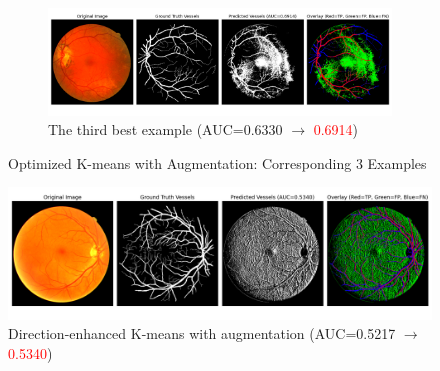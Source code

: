 \documentclass[final]{article}
\begin{document}
\begin{figure}[H]
    \ContinuedFloat
    \centering
    \begin{subfigure}[H]{\textwidth}
        \centering
        \includegraphics[scale=0.3]{Figures/4 Optimized 3rd.png}
        \vspace{-0.25cm}
        \caption{The third best example (AUC=0.6330 $\rightarrow$ \textcolor{red}{0.6914})}
        \label{fig:opt_aug3}
    \end{subfigure}
    \caption{Optimized K-means with Augmentation: Corresponding 3 Examples}
    \label{fig:opt_aug}
\end{figure}
\begin{figure}[H]
    \centering
    \includegraphics[scale=0.3]{Figures/6 Directed (Merge 3 Clusters).png}
    \vspace{-0.25cm}
    \caption{Direction-enhanced K-means with augmentation (AUC=0.5217 $\rightarrow$ \textcolor{red}{0.5340})}
    \label{fig:de_aug}
\end{figure}






\newpage




\end{document}
